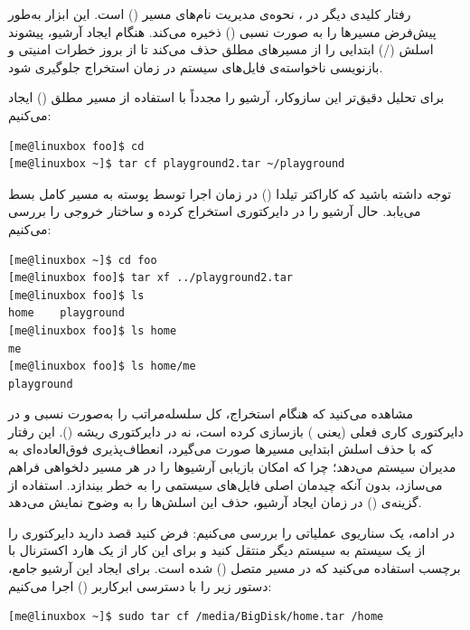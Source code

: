 رفتار کلیدی دیگر در ، نحوه‌ی مدیریت نام‌های مسیر () است. این ابزار به‌طور پیش‌فرض مسیرها را به صورت نسبی () ذخیره می‌کند. هنگام ایجاد آرشیو،  پیشوند اسلش (/) ابتدایی را از مسیرهای مطلق حذف می‌کند تا از بروز خطرات امنیتی و بازنویسی ناخواسته‌ی فایل‌های سیستم در زمان استخراج جلوگیری شود.

برای تحلیل دقیق‌تر این سازوکار، آرشیو را مجدداً با استفاده از مسیر مطلق () ایجاد می‌کنیم:

\begin{latin}
\begin{lstlisting}
[me@linuxbox foo]$ cd
[me@linuxbox ~]$ tar cf playground2.tar ~/playground
\end{lstlisting}
\end{latin}

توجه داشته باشید که کاراکتر تیلدا (\cmd{\textasciitilde}) در زمان اجرا توسط پوسته به مسیر کامل  بسط می‌یابد. حال آرشیو را در دایرکتوری  استخراج کرده و ساختار خروجی را بررسی می‌کنیم:

\begin{latin}
\begin{lstlisting}
[me@linuxbox ~]$ cd foo
[me@linuxbox foo]$ tar xf ../playground2.tar
[me@linuxbox foo]$ ls
home    playground
[me@linuxbox foo]$ ls home
me
[me@linuxbox foo]$ ls home/me
playground
\end{lstlisting}
\end{latin}

مشاهده می‌کنید که  هنگام استخراج، کل سلسله‌مراتب  را به‌صورت نسبی و در دایرکتوری کاری فعلی (یعنی ) بازسازی کرده است، نه در دایرکتوری ریشه (\cmd{/}). این رفتار که با حذف اسلش ابتدایی مسیرها صورت می‌گیرد، انعطاف‌پذیری فوق‌العاده‌ای به مدیران سیستم می‌دهد؛ چرا که امکان بازیابی آرشیوها را در هر مسیر دلخواهی فراهم می‌سازد، بدون آنکه چیدمان اصلی فایل‌های سیستمی را به خطر بیندازد. استفاده از گزینه‌ی  () در زمان ایجاد آرشیو، حذف این اسلش‌ها را به وضوح نمایش می‌دهد.

در ادامه، یک سناریوی عملیاتی را بررسی می‌کنیم: فرض کنید قصد دارید دایرکتوری  را از یک سیستم به سیستم دیگر منتقل کنید و برای این کار از یک هارد اکسترنال با برچسب  استفاده می‌کنید که در مسیر  متصل () شده است. برای ایجاد این آرشیو جامع، دستور زیر را با دسترسی ابرکاربر () اجرا می‌کنیم:

\begin{latin}
\begin{lstlisting}
[me@linuxbox ~]$ sudo tar cf /media/BigDisk/home.tar /home
\end{lstlisting}
\end{latin}


